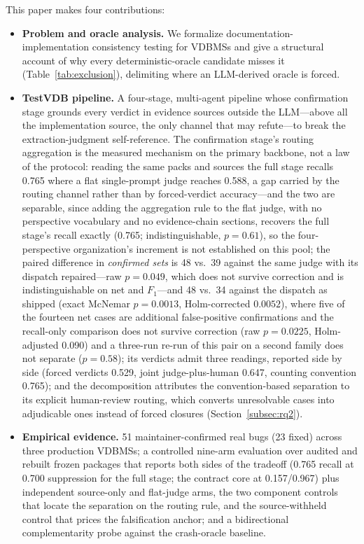 \documentclass[acmsmall,screen,review,anonymous]{acmart}
\newcommand{\system}{TestVDB}
\begin{document}
This paper makes four contributions:
\begin{itemize}
  \item \textbf{Problem and oracle analysis.} We formalize documentation-implementation consistency testing for VDBMSs and give a structural account of why every deterministic-oracle candidate misses it (Table~\ref{tab:exclusion}), delimiting where an LLM-derived oracle is forced.
  \item \textbf{\system{} pipeline.} A four-stage, multi-agent pipeline whose confirmation stage grounds every verdict in evidence sources outside the LLM---above all the implementation source, the only channel that may refute---to break the extraction-judgment self-reference. The confirmation stage's routing aggregation is the measured mechanism on the primary backbone, not a law of the protocol: reading the same packs and sources the full stage recalls 0.765 where a flat single-prompt judge reaches 0.588, a gap carried by the routing channel rather than by forced-verdict accuracy---and the two are separable, since adding the aggregation rule to the flat judge, with no perspective vocabulary and no evidence-chain sections, recovers the full stage's recall exactly (0.765; indistinguishable, $p{=}0.61$), so the four-perspective organization's increment is not established on this pool; the paired difference in \emph{confirmed sets} is 48 vs.\ 39 against the same judge with its dispatch repaired---raw $p{=}0.049$, which does not survive correction and is indistinguishable on net and $F_1$---and 48 vs.\ 34 against the dispatch as shipped (exact McNemar $p{=}0.0013$, Holm-corrected $0.0052$), where five of the fourteen net cases are additional false-positive confirmations and the recall-only comparison does not survive correction (raw $p{=}0.0225$, Holm-adjusted 0.090) and a three-run re-run of this pair on a second family does not separate ($p{=}0.58$); its verdicts admit three readings, reported side by side (forced verdicts 0.529, joint judge-plus-human 0.647, counting convention 0.765); and the decomposition attributes the convention-based separation to its explicit human-review routing, which converts unresolvable cases into adjudicable ones instead of forced closures (Section~\ref{subsec:rq2}).
  \item \textbf{Empirical evidence.} 51 maintainer-confirmed real bugs (23 fixed) across three production VDBMSs; a controlled nine-arm evaluation over audited and rebuilt frozen packages that reports both sides of the tradeoff (0.765 recall at 0.700 suppression for the full stage; the contract core at 0.157/0.967) plus independent source-only and flat-judge arms, the two component controls that locate the separation on the routing rule, and the source-withheld control that prices the falsification anchor; and a bidirectional complementarity probe against the crash-oracle baseline.

\end{itemize}
\end{document}

